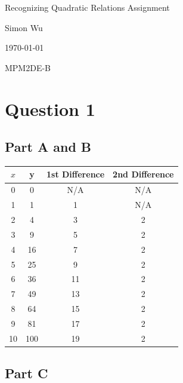 \documentclass[12pt]{article}
\begin{document}
\begin{titlepage}

\begin{center}
    \Huge{Recognizing Quadratic Relations Assignment}
    
    \vspace{1in}
    
    \Large{Simon Wu}
    
    \Large{\today}
    
    \vspace{1in}
    
    \Large{MPM2DE-B}

    
\end{center}

\tableofcontents

\end{titlepage}

\section{Question 1}

\subsection{Part A and B}

\begin{center}
 \begin{tabular}{||c | c | c | c||} 
 \hline
 $x$ & y & 1st Difference & 2nd Difference \\ [0.5ex] 
 \hline\hline
 0 & 0 & N/A & N/A \\ 
 \hline
 1 & 1 & 1 & N/A \\ 
 \hline
 2 & 4 & 3 & 2 \\
 \hline
 3 & 9 & 5 & 2 \\
 \hline
 4 & 16 & 7 & 2 \\
 \hline
 5 & 25 & 9 & 2 \\
 \hline
 6 & 36 & 11 & 2 \\
 \hline
 7 & 49 & 13 & 2 \\
 \hline
 8 & 64 & 15 & 2 \\
 \hline
 9 & 81 & 17 & 2 \\
 \hline
 10 & 100 & 19 & 2 \\
 \hline
\end{tabular}
\end{center}

\subsection{Part C}
\end{document}
